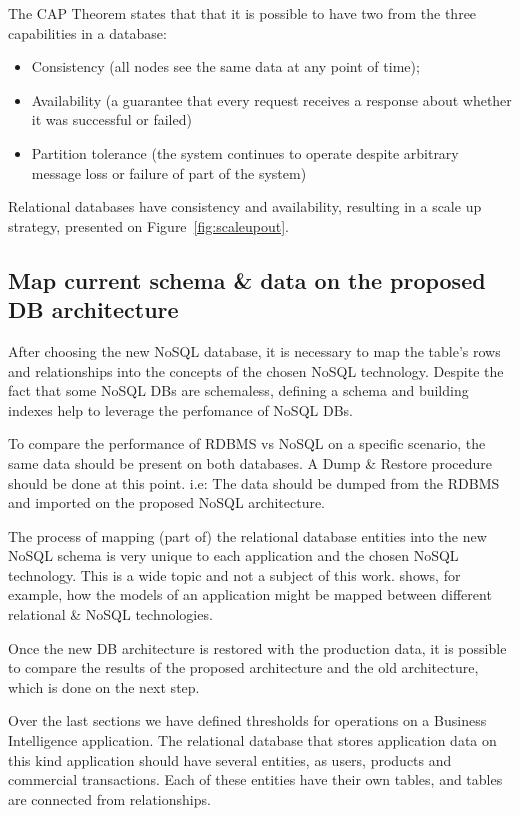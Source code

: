 The CAP Theorem states that that it is possible to have two from the three capabilities in a database: 
\begin{itemize}
\item{Consistency (all nodes see the same data at any point of time);}
\item{Availability (a guarantee that every request receives a response about whether it was successful or failed)}
\item{Partition tolerance (the system continues to operate despite arbitrary message loss or failure of part of the system)
}
\end{itemize}

Relational databases have consistency and availability, resulting in a scale up strategy, presented on Figure~\ref{fig:scaleupout}.

\subsection{Map current schema \& data on the proposed DB architecture}
After choosing the new NoSQL database, it is necessary to map the table's rows and relationships into the concepts of the chosen NoSQL technology. Despite the fact that some NoSQL DBs are schemaless, defining a schema and building indexes help to leverage the perfomance of NoSQL DBs.

To compare the performance of RDBMS vs NoSQL on a specific scenario, the same data should be present on both databases. A Dump \& Restore procedure should be done at this point. i.e: The data should be dumped from the RDBMS and imported on the proposed NoSQL architecture.

The process of mapping (part of) the relational database entities into the new NoSQL schema is very unique to each application and the chosen NoSQL technology. This is a wide topic and not a subject of this work. \cite{bahl2014mysql} shows, for example, how the models of an application might be mapped between different relational \& NoSQL technologies.

Once the new DB architecture is restored with the production data, it is possible to compare the results of the proposed architecture and the old architecture, which is done on the next step.

Over the last sections we have defined thresholds for operations on a Business Intelligence application. The relational database that stores application data on this kind application should have several entities, as users, products and commercial transactions. Each of these entities have their own tables, and tables are connected from relationships. 

